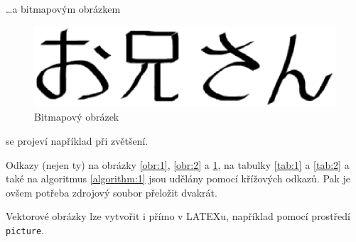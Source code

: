 \documentclass[11pt, ]{article}
\begin{document}
\noindent
\dots a bitmapovým obrázkem

\begin{figure}[h]
    \centering
    \includegraphics[scale=0.75]{pictures/oniisan2.eps}
    \caption{Bitmapový obrázek}
    \label{obr:3}
\end{figure}

\noindent
se projeví například při zvětšení.

Odkazy (nejen ty) na obrázky \ref{obr:1}, \ref{obr:2} a \ref{obr:3}, na  
tabulky \ref{tab:1} a \ref{tab:2} a také na algoritmus \ref{algorithm:1} jsou udělány pomocí 
křížových odkazů. Pak je ovšem potřeba zdrojový soubor přeložit dvakrát.

Vektorové obrázky lze vytvořit i přímo v LATEXu, například pomocí prostředí 
\verb!picture!.
\end{document}
